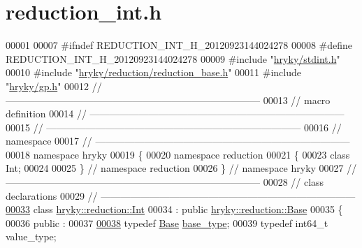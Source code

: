 \hypertarget{reduction__int_8h_source}{\section{reduction\-\_\-int.\-h}
}

\begin{DoxyCode}
00001 
00007 \textcolor{preprocessor}{#ifndef REDUCTION\_INT\_H\_20120923144024278}
00008 \textcolor{preprocessor}{}\textcolor{preprocessor}{#define REDUCTION\_INT\_H\_20120923144024278}
00009 \textcolor{preprocessor}{}\textcolor{preprocessor}{#include "\hyperlink{stdint_8h}{hryky/stdint.h}"}
00010 \textcolor{preprocessor}{#include "\hyperlink{reduction__base_8h}{hryky/reduction/reduction_base.h}"}
00011 \textcolor{preprocessor}{#include "\hyperlink{gp_8h}{hryky/gp.h}"}
00012 \textcolor{comment}{//
      ------------------------------------------------------------------------------}
00013 \textcolor{comment}{// macro definition}
00014 \textcolor{comment}{//
      ------------------------------------------------------------------------------}
00015 \textcolor{comment}{//
      ------------------------------------------------------------------------------}
00016 \textcolor{comment}{// namespace}
00017 \textcolor{comment}{//
      ------------------------------------------------------------------------------}
00018 \textcolor{keyword}{namespace }hryky
00019 \{
00020 \textcolor{keyword}{namespace }reduction
00021 \{
00023     \textcolor{keyword}{class }Int;
00024 
00025 \} \textcolor{comment}{// namespace reduction}
00026 \} \textcolor{comment}{// namespace hryky}
00027 \textcolor{comment}{//
      ------------------------------------------------------------------------------}
00028 \textcolor{comment}{// class declarations}
00029 \textcolor{comment}{//
      ------------------------------------------------------------------------------}
\hypertarget{reduction__int_8h_source_l00033}{}\hyperlink{classhryky_1_1reduction_1_1_int}{00033} \textcolor{comment}{}\textcolor{keyword}{class }\hyperlink{classhryky_1_1reduction_1_1_int}{hryky::reduction::Int}
00034     : \textcolor{keyword}{public} \hyperlink{classhryky_1_1reduction_1_1_base}{hryky::reduction::Base}
00035 \{
00036 \textcolor{keyword}{public} :
00037 
\hypertarget{reduction__int_8h_source_l00038}{}\hyperlink{classhryky_1_1reduction_1_1_int_ae608658dae381b8a1cc5b61ed71543d2}{00038}     \textcolor{keyword}{typedef} \hyperlink{classhryky_1_1reduction_1_1_base}{Base}    \hyperlink{classhryky_1_1reduction_1_1_int_ae608658dae381b8a1cc5b61ed71543d2}{base_type};
00039     \textcolor{keyword}{typedef} int64\_t value\_type;

\end{DoxyCode}
